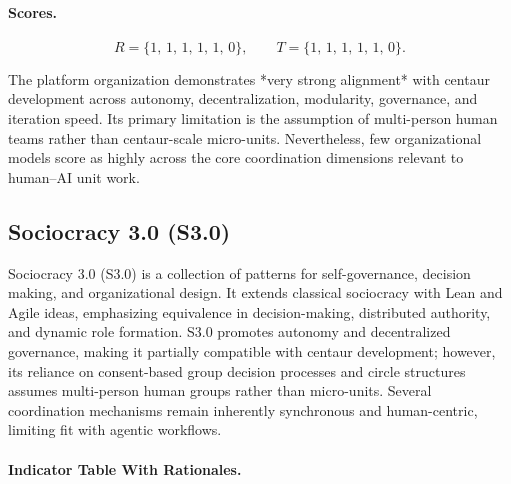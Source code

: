 \documentclass[11pt, a4paper, twocolumn]{article} %
\begin{document}
\paragraph{Scores.}

\[
R = \{1,\,1,\,1,\,1,\,1,\,0\},
\qquad
T = \{1,\,1,\,1,\,1,\,1,\,0\}.
\]

The platform organization demonstrates *very strong alignment* with centaur
development across autonomy, decentralization, modularity, governance, and
iteration speed. Its primary limitation is the assumption of multi-person human
teams rather than centaur-scale micro-units. Nevertheless, few organizational
models score as highly across the core coordination dimensions relevant to
human--AI unit work.

\newpage
\subsection*{Sociocracy 3.0 (S3.0)}

Sociocracy 3.0 (S3.0) is a collection of patterns for self-governance, decision
making, and organizational design. It extends classical sociocracy with Lean and
Agile ideas, emphasizing equivalence in decision-making, distributed authority,
and dynamic role formation. S3.0 promotes autonomy and decentralized governance,
making it partially compatible with centaur development; however, its reliance
on consent-based group decision processes and circle structures assumes
multi-person human groups rather than micro-units. Several coordination
mechanisms remain inherently synchronous and human-centric, limiting fit with
agentic workflows.

\paragraph{Indicator Table With Rationales.}
\end{document}
